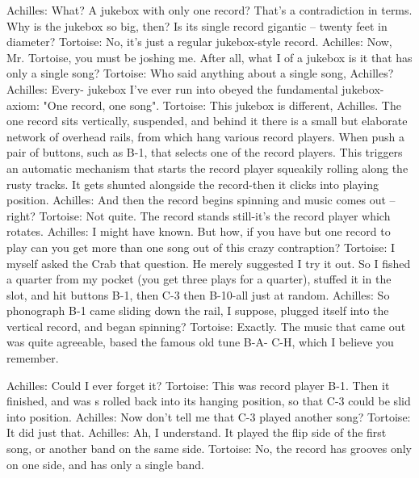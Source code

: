 Achilles: What? A jukebox with only one record? That's a contradiction in terms. Why is the
        jukebox so big, then? Is its single record gigantic -- twenty feet in diameter?
Tortoise: No, it's just a regular jukebox-style record.
Achilles: Now, Mr. Tortoise, you must be joshing me. After all, what I
of a jukebox is it that has only a single song?
Tortoise: Who said anything about a single song, Achilles?
Achilles: Every- jukebox I've ever run into obeyed the fundamental jukebox-axiom: "One record,
        one song".
Tortoise: This jukebox is different, Achilles. The one record sits vertically, suspended, and
        behind it there is a small but elaborate network of overhead rails, from which hang
        various record players. When push a pair of buttons, such as B-1, that selects one of the
        record players. This triggers an automatic mechanism that starts the record player
        squeakily rolling along the rusty tracks. It gets shunted alongside the record-then it clicks
        into playing position.
Achilles: And then the record begins spinning and music comes out -- right?
Tortoise: Not quite. The record stands still-it's the record player which rotates.
Achilles: I might have known. But how, if you have but one record to play can you get more than
        one song out of this crazy contraption?
Tortoise: I myself asked the Crab that question. He merely suggested I try it out. So I fished a
        quarter from my pocket (you get three plays for a quarter), stuffed it in the slot, and hit
        buttons B-1, then C-3 then B-10-all just at random.
Achilles: So phonograph B-1 came sliding down the rail, I suppose, plugged itself into the
        vertical record, and began spinning?
Tortoise: Exactly. The music that came out was quite agreeable, based the famous old tune B-A-
        C-H, which I believe you remember.




Achilles: Could I ever forget it?
Tortoise: This was record player B-1. Then it finished, and was s rolled back into its hanging
       position, so that C-3 could be slid into position.
Achilles: Now don't tell me that C-3 played another song?
Tortoise: It did just that.
Achilles: Ah, I understand. It played the flip side of the first song, or another band on the same
       side.
Tortoise: No, the record has grooves only on one side, and has only a single band.

